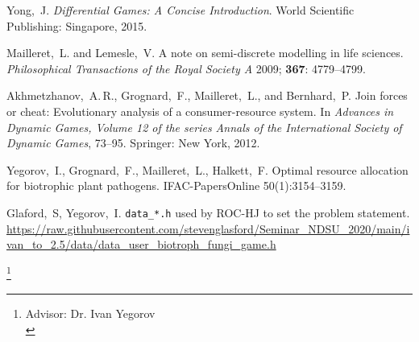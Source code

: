 \documentclass[11pt]{amsart}
\begin{document}
\begin{thebibliography}{}
Yong,~J.
{\it Differential Games{\rm :} A Concise Introduction}.
World Scientific Publishing: Singapore, 2015.

Mailleret,~L. and Lemesle,~V.
A note on semi-discrete modelling in life sciences.
{\it Philosophical Transactions of the Royal Society A} 2009; {\bf 367}: 4779--4799.

Akhmetzhanov,~A.\,R., Grognard,~F., Mailleret,~L., and Bernhard,~P.
Join forces or cheat: Evolutionary analysis of a consumer-resource system.
In {\it Advances in Dynamic Games{\rm ,}
Volume {\rm 12} of the series Annals of the International Society of Dynamic Games}, 73--95.
Springer: New York, 2012.

Yegorov,~I., Grognard,~F., Mailleret,~L., Halkett,~F.
Optimal resource allocation for biotrophic plant
pathogens.
IFAC-PapersOnline 50(1):3154–3159.

Glaford,~S, Yegorov,~I.
\texttt{data\_*.h} used by ROC-HJ to set the problem statement.
\url{https://raw.githubusercontent.com/stevenglasford/Seminar_NDSU_2020/main/ivan_to_2.5/data/data_user_biotroph_fungi_game.h}

\end{thebibliography}

\hspace{1in}

\noindent\thanks{Advisor: Dr. Ivan Yegorov\\}
\address{Department of Mathematics, North Dakota State University, PO Box 6050, Fargo, ND 58108-6050, USA}
\end{document}
